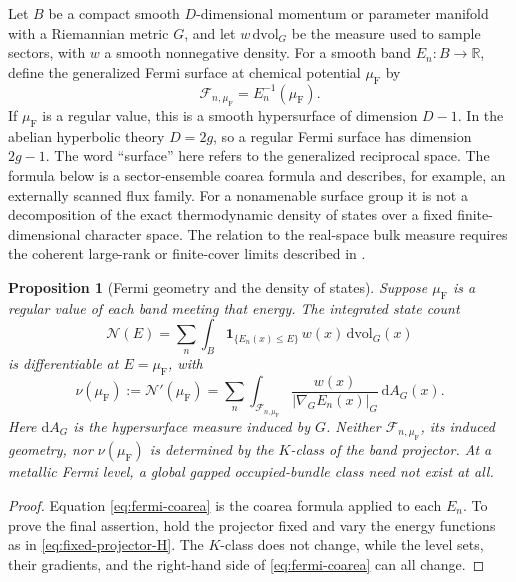 \documentclass[11pt]{article}
\newtheorem{proposition}[theorem]{Proposition}
\theoremstyle{definition}
\theoremstyle{remark}
\newcommand{\RR}{\mathbb R}
\newcommand{\dd}{\mathrm d}
\begin{document}
Let \(B\) be a compact smooth \(D\)-dimensional momentum or parameter
manifold with a Riemannian metric \(G\), and let
\(w\,\dd\mathrm{vol}_G\) be the measure used to sample sectors, with
\(w\) a smooth nonnegative density.  For a smooth band
\(E_n:B\to\RR\), define the generalized Fermi surface at chemical potential
\(\mu_{\mathrm F}\) by
\[
          \mathcal F_{n,\mu_{\mathrm F}}
             =E_n^{-1}(\mu_{\mathrm F}).
                    \tag{8.5}\label{eq:fermi-level-set}
\]
If \(\mu_{\mathrm F}\) is a regular value, this is a smooth hypersurface of
dimension \(D-1\).  In the abelian hyperbolic theory \(D=2g\), so a regular
Fermi surface has dimension \(2g-1\).  The word ``surface'' here refers to
the generalized reciprocal space.  The formula below is a sector-ensemble
coarea formula and describes, for example, an externally scanned flux family.
For a nonamenable surface group it is not a decomposition of the exact
thermodynamic density of states over a fixed finite-dimensional character
space.  The relation to the real-space bulk measure requires the coherent
large-rank or finite-cover limits described in
.

\begin{proposition}[Fermi geometry and the density of states]
\label{prop:fermi-coarea}
Suppose \(\mu_{\mathrm F}\) is a regular value of each band meeting that
energy.  The integrated state count
\[
       \mathcal N(E)
          =\sum_n\int_B
              \mathbf1_{\{E_n(x)\leq E\}}\,
              w(x)\,\dd\mathrm{vol}_G(x)
              \tag{8.6}\label{eq:integrated-state-count}
\]
is differentiable at \(E=\mu_{\mathrm F}\), with
\[
       \nu(\mu_{\mathrm F}):=\mathcal N'(\mu_{\mathrm F})
          =\sum_n\int_{\mathcal F_{n,\mu_{\mathrm F}}}
             \frac{w(x)}
                  {|\nabla_G E_n(x)|_G}\,
             \dd A_G(x).
             \tag{8.7}\label{eq:fermi-coarea}
\]
Here \(\dd A_G\) is the hypersurface measure induced by \(G\).
Neither \(\mathcal F_{n,\mu_{\mathrm F}}\), its induced geometry, nor
\(\nu(\mu_{\mathrm F})\) is determined by the \(K\)-class of the band
projector.  At a metallic Fermi level, a global gapped occupied-bundle class
need not exist at all.
\end{proposition}

\begin{proof}
Equation \eqref{eq:fermi-coarea} is the coarea formula applied to each
\(E_n\).  To prove the final assertion, hold the projector fixed and vary
the energy functions as in \eqref{eq:fixed-projector-H}.  The \(K\)-class
does not change, while the level sets, their gradients, and the right-hand
side of \eqref{eq:fermi-coarea} can all change.
\end{proof}
\end{document}
